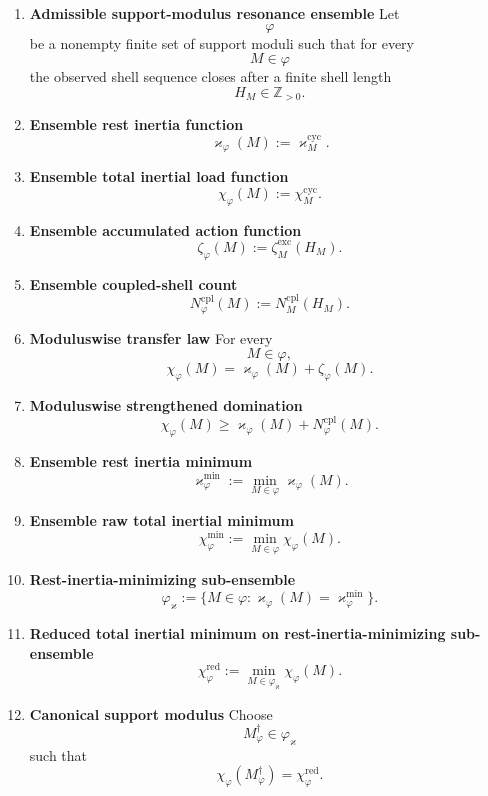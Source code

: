 \documentclass[11pt,letterpaper]{article}
\theoremstyle{plain}
\theoremstyle{definition}
\theoremstyle{remark}
\newcommand{\RestInertia}{\varkappa}
\newcommand{\TotInertia}{\chi}
\newcommand{\AccAction}{\zeta}
\newcommand{\ResEns}{\varphi}
\begin{document}
\begin{enumerate}[resume]
\item \textbf{Admissible support-modulus resonance ensemble}
Let
\[
\ResEns
\]
be a nonempty finite set of support moduli such that for every
\[
M\in\ResEns
\]
the observed shell sequence closes after a finite shell length
\[
H_M\in\mathbb Z_{>0}.
\]

\item \textbf{Ensemble rest inertia function}
\[
\RestInertia_{\ResEns}(M):=\RestInertia_M^{\mathrm{cyc}}.
\]

\item \textbf{Ensemble total inertial load function}
\[
\TotInertia_{\ResEns}(M):=\TotInertia_M^{\mathrm{cyc}}.
\]

\item \textbf{Ensemble accumulated action function}
\[
\AccAction_{\ResEns}(M):=\AccAction_M^{\mathrm{exc}}(H_M).
\]

\item \textbf{Ensemble coupled-shell count}
\[
N_{\ResEns}^{\mathrm{cpl}}(M):=N_M^{\mathrm{cpl}}(H_M).
\]

\item \textbf{Moduluswise transfer law}
For every
\[
M\in\ResEns,
\]
\[
\TotInertia_{\ResEns}(M)
=
\RestInertia_{\ResEns}(M)+\AccAction_{\ResEns}(M).
\]

\item \textbf{Moduluswise strengthened domination}
\[
\TotInertia_{\ResEns}(M)\ge \RestInertia_{\ResEns}(M)+N_{\ResEns}^{\mathrm{cpl}}(M).
\]

\item \textbf{Ensemble rest inertia minimum}
\[
\RestInertia_{\ResEns}^{\min}:=\min_{M\in\ResEns}\RestInertia_{\ResEns}(M).
\]

\item \textbf{Ensemble raw total inertial minimum}
\[
\TotInertia_{\ResEns}^{\min}:=\min_{M\in\ResEns}\TotInertia_{\ResEns}(M).
\]

\item \textbf{Rest-inertia-minimizing sub-ensemble}
\[
\ResEns_{\varkappa}
:=
\{M\in\ResEns:\RestInertia_{\ResEns}(M)=\RestInertia_{\ResEns}^{\min}\}.
\]

\item \textbf{Reduced total inertial minimum on rest-inertia-minimizing sub-ensemble}
\[
\TotInertia_{\ResEns}^{\mathrm{red}}
:=
\min_{M\in\ResEns_{\varkappa}}\TotInertia_{\ResEns}(M).
\]

\item \textbf{Canonical support modulus}
Choose
\[
M_{\ResEns}^{\dagger}\in\ResEns_{\varkappa}
\]
such that
\[
\TotInertia_{\ResEns}(M_{\ResEns}^{\dagger})
=
\TotInertia_{\ResEns}^{\mathrm{red}}.
\]


\end{enumerate}
\end{document}
